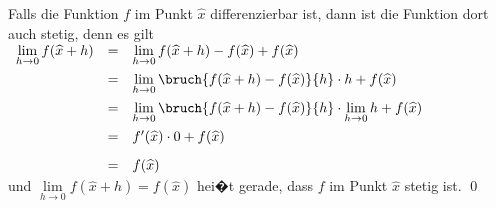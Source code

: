 \remark
Falls die Funktion $f$ im Punkt $\widehat{x}$ differenzierbar ist,
dann ist die Funktion dort auch stetig, denn es gilt 
\\[0.3cm]
\hspace*{1.3cm}
$
\begin{array}[t]{lcl}
\lim\limits_{h \rightarrow 0} f(\widehat{x}+h) & = &
 \lim\limits_{h \rightarrow 0} f(\widehat{x}+h) - f(\widehat{x}) + f(\widehat{x}) \\[0.3cm]
& = & \lim\limits_{h \rightarrow 0} \bruch{f(\widehat{x}+h) - f(\widehat{x})}{h} \cdot h + f(\widehat{x}) \\[0.3cm]
& = & \lim\limits_{h \rightarrow 0} \bruch{f(\widehat{x}+h) - f(\widehat{x})}{h} \cdot \lim\limits_{h \rightarrow 0} h + f(\widehat{x}) \\[0.3cm]
& = & f'(\widehat{x}) \cdot 0 + f(\widehat{x}) \\[0.3cm]
& = & f(\widehat{x})
\end{array}
$
\\[0.3cm]
und $\lim\limits_{h \rightarrow 0} f(\widehat{x}+h) = f(\widehat{x})$ hei�t gerade, dass $f$
im Punkt $\widehat{x}$ stetig ist. \qed
\vspace*{0.3cm}

